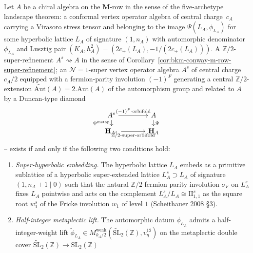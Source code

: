 \begin{theorem}
\label{thm:bkm-conway-super-refinement-existence}
Let $A$ be a chiral algebra on the $\mathbf{M}$-row in the sense of
the five-archetype landscape theorem: a conformal vertex operator
algebra of central charge~$c_A$ carrying a Virasoro stress tensor and
belonging to the image $\Psi(L_A,\phi_{L_A})$ for some hyperbolic
lattice $L_A$ of signature $(1, n_A)$ with automorphic denominator
$\phi_{L_A}$ and Lusztig pair
$(K_A, \hbar_A^2) = (2 c_+(L_A), -1/(2 c_+(L_A)))$.
A $\mathbb{Z}/2$-super-refinement
$A^{s} \rightsquigarrow A$ in the sense of
Corollary~\ref{cor:bkm-conway-m-row-super-refinement}; an
$\mathcal{N}{=}1$-super vertex operator algebra $A^{s}$ of central
charge~$c_A/2$ equipped with a fermion-parity involution
$(-1)^F$ generating a central $\mathbb{Z}/2$-extension
$\widetilde{\mathrm{Aut}}(A) = 2.\mathrm{Aut}(A)$ of the automorphism
group and related to $A$ by a Duncan-type diamond
\[
 \begin{tikzcd}[column sep=large, row sep=small]
 A^{s} \arrow[r, "(-1)^F \cdot \mathrm{orbifold}"] \arrow[d, "\Psi^{\mathrm{metap}}"']
 & A \arrow[d, "\Psi"] \\
 \mathbf{H}_{A^{s}} \arrow[r, "\mathbb{Z}/2\text{-}\mathrm{super\text{-}orbifold}"']
 & \mathbf{H}_{A}
 \end{tikzcd}
\]
-- exists if and only if the following two conditions hold:
\begin{enumerate}[label=\textup{(SR\arabic*)}]
\item \emph{Super-hyperbolic embedding.} The hyperbolic lattice
$L_A$ embeds as a primitive sublattice of a hyperbolic super-extended
lattice $L_A^{s}\supset L_A$ of signature $(1, n_A + 1 \mid 0)$ such
that the natural $\mathbb{Z}/2$-fermion-parity involution $\sigma_F$
on $L_A^{s}$ fixes $L_A$ pointwise and acts on the complement
$L_A^{s}/L_A\cong \mathrm{II}_{1,1}^{s}$ as the square root
$w_1^{s}$ of the Fricke involution $w_1$ of level $1$
(Scheithauer 2008 \S$3$).
\item \emph{Half-integer metaplectic lift.} The automorphic
datum $\phi_{L_A}$ admits a half-integer-weight lift
$\widetilde\phi_{L_A}\in
M^{\mathrm{weak}}_{k_A/2}(\widetilde{\mathrm{SL}}_2(\mathbb{Z}),
v_\eta^{12})$
on the metaplectic double cover
$\widetilde{\mathrm{SL}}_2(\mathbb{Z})\to\mathrm{SL}_2(\mathbb{Z})$

\end{enumerate}
\end{theorem}
